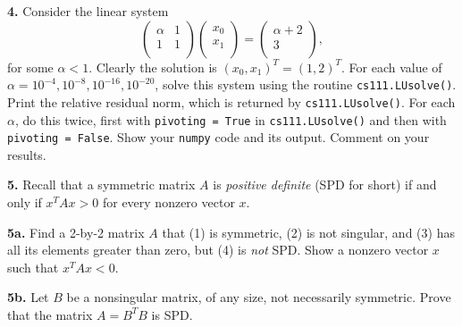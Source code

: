 \documentclass[11pt]{article}
\begin{document}
\par\bigskip
{\bf 4.} Consider the linear system
$$
   \left(
   \begin{array}{cc}
      \alpha & 1 \\ 	
           1 & 1 \\ 	
   \end{array} \right)
   \left(
   \begin{array}{c}
      x_0 \\ 	
      x_1 \\ 	
   \end{array} \right)
   =
   \left(
   \begin{array}{cc}
      \alpha + 2 \\ 	
               3 \\ 	
   \end{array} \right),
$$
for some $\alpha < 1$.
Clearly the solution is $(x_0, x_1)^T = (1,2)^T$.
For each value of $\alpha = 10^{-4}, 10^{-8}, 10^{-16}, 10^{-20}$,
solve this system using the routine {\tt cs111.LUsolve()}.
Print the relative residual norm, which is returned by {\tt cs111.LUsolve()}.
For each $\alpha$, do this twice, first with {\tt pivoting = True} 
in {\tt cs111.LUsolve()} and then with {\tt pivoting = False}.
Show your {\tt numpy} code and its output.
Comment on your results.


\par\bigskip
{\bf 5.} Recall that a symmetric matrix $A$ is {\em positive definite}
(SPD for short) if and only if $x^TAx>0$ for every nonzero vector $x$.

\par\medskip
{\bf 5a.} Find a 2-by-2 matrix $A$ that (1) is symmetric, (2) is not singular,
and (3) has all its elements greater than zero, but (4) is {\em not} SPD.
Show a nonzero vector $x$ such that $x^TAx<0$.

\par\medskip
{\bf 5b.} Let $B$ be a nonsingular matrix, of any size, 
not necessarily symmetric.
Prove that the matrix $A=B^TB$ is SPD.
\end{document}
